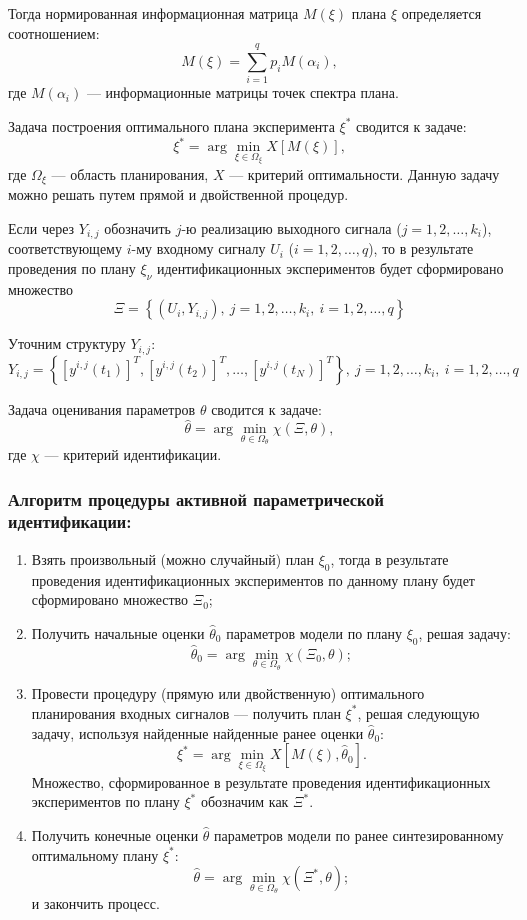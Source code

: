 \documentclass[a4paper,14pt]{extarticle}
\begin{document}
Тогда нормированная информационная матрица $M(\xi)$ плана $\xi$ определяется
соотношением:
\[
	M(\xi) = \sum\limits_{i=1}^q p_i M(\alpha_i),
\]
где $M(\alpha_i)$ --- информационные матрицы точек спектра плана.

Задача построения оптимального плана эксперимента $\xi^*$ сводится к задаче:
\[
	\xi^* = \arg \min\limits_{\xi \in \Omega_{\xi}} X[M(\xi)],
\]
где $\Omega_{\xi}$ --- область планирования, $X$ --- критерий оптимальности.
Данную задачу можно решать путем прямой и двойственной процедур.

Если через $Y_{i,j}$ обозначить $j$-ю реализацию выходного сигнала ($j = 1, 2,
\ldots, k_i$), соответствующему $i$-му входному сигналу $U_i$ ($i = 1, 2,
\ldots, q$), то в результате проведения по плану $\xi_{\nu}$ идентификационных
экспериментов будет сформировано множество
\[
	\Xi = \left\{ 
		(U_i, Y_{i,j}),\ j = 1, 2, \ldots, k_i,\ i = 1, 2, \ldots, q
	\right\}
\]

Уточним структуру $Y_{i,j}$:
\[
	Y_{i,j}	= \left\{ 
		[y^{i,j}(t_1)]^T, [y^{i,j}(t_2)]^T, \ldots, [y^{i,j}(t_N)]^T \right\},\
		j = 1, 2, \ldots, k_i,\ i = 1, 2, \ldots, q
\]

Задача оценивания параметров $\theta$ сводится к задаче:
\[
	\hat{\theta} = \arg \min\limits_{\theta \in \Omega_{\theta}} \chi(\Xi,
	\theta),
\]
где $\chi$ --- критерий идентификации.

\subsubsection{Алгоритм процедуры активной параметрической идентификации:}

\begin{enumerate}
	\item Взять произвольный (можно случайный) план $\xi_0$,
		тогда в результате проведения идентификационных экспериментов по данному
		плану будет сформировано множество $\Xi_0$;
	\item Получить начальные оценки $\hat{\theta}_0$ параметров модели
		по плану $\xi_0$, решая задачу:
\[
	\hat{\theta}_0 = \arg\min\limits_{\theta \in \Omega_{\theta}}
		\chi(\Xi_0, \theta);
\]
	\item Провести процедуру (прямую или двойственную) оптимального планирования
		входных сигналов --- получить план $\xi^{*}$, решая следующую задачу,
		используя найденные найденные ранее оценки $\hat{\theta}_0$:
\[
	\xi^{*} = \arg\min\limits_{\xi \in \Omega_{\xi}} X[M(\xi), \hat{\theta}_0].
\]
	Множество, сформированное в результате проведения идентификационных
		экспериментов по плану $\xi^{*}$ обозначим как $\Xi^{*}$.
	\item Получить конечные оценки $\hat{\theta}$ параметров модели по ранее
		синтезированному оптимальному плану $\xi^{*}$:
\[
	\hat{\theta} = \arg\min\limits_{\theta \in \Omega_{\theta}} \chi(\Xi^{*},
		\theta);
\]
и закончить процесс.

\end{enumerate}
\end{document}
